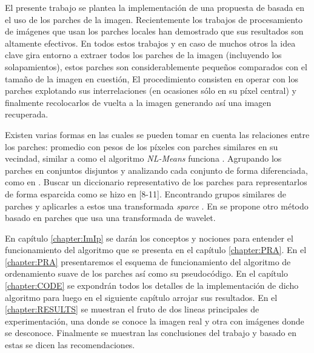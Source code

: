 El presente trabajo se plantea la implementaci\'on de una propuesta de \II basada en el uso de los parches de la imagen. Recientemente los trabajos \cite{buades2005review,chatterjee2009clustering,yu2010image,yu2011solving,dong2011image,dong2011sparsity,zoran2011learning,elad2006image,mairal2007sparse,mairal2009non,zeyde2010single,dabov2007image,li2008patch} de procesamiento de im\'agenes que usan los parches locales han demostrado que sus resultados son altamente efectivos. En todos estos trabajos y en caso de muchos otros la idea clave gira entorno a extraer todos los parches de la imagen (incluyendo los solapamientos), estos parches son considerablemente pequeños comparados con el tamaño de la imagen en cuesti\'on, El procedimiento consisten en operar con los parches explotando sus interrelaciones (en ocasiones s\'olo en su p\'ixel central) y finalmente recolocarlos de vuelta a la imagen generando as\'i una imagen recuperada.

Existen varias formas en las cuales se pueden tomar en cuenta las relaciones entre los parches: promedio con pesos de los p\'ixeles con parches similares en su vecindad, similar a como el algoritmo \textit{NL-Means} funciona \cite{buades2005review}. Agrupando los parches en conjuntos disjuntos y analizando cada conjunto de forma diferenciada, como en \cite{chatterjee2009clustering,yu2010image,yu2011solving,dong2011image,dong2011sparsity,zoran2011learning}. Buscar un diccionario representativo de los parches para representarlos de forma esparcida como se hizo en [8-11]. Encontrando grupos similares de parches y aplicarles a estos una transformada \textit{sparce} \cite{mairal2009non,dabov2007image,li2008patch}. En \cite{ram2011generalized,ram2012redundant} se propone otro m\'etodo basado en parches que usa una transformada de wavelet.

En cap\'itulo \ref{chapter:ImIp} se dar\'an los conceptos y nociones para entender el funcionamiento del algoritmo que se presenta en el cap\'itulo \ref{chapter:PRA}. En el \ref{chapter:PRA} presentaremos el esquema de funcionamiento del algoritmo de ordenamiento suave de los parches as\'i como su pseudoc\'odigo. En el cap\'itulo \ref{chapter:CODE} se expondr\'an todos los detalles de la implementaci\'on de dicho algoritmo para luego en el siguiente cap\'itulo  arrojar sus resultados. En el \ref{chapter:RESULTS} se muestran el fruto de dos lineas principales de experimentaci\'on, una donde se conoce la imagen real y otra con imágenes donde se desconoce. Finalmente se muestran las conclusiones del trabajo y basado en estas se dicen las recomendaciones.
